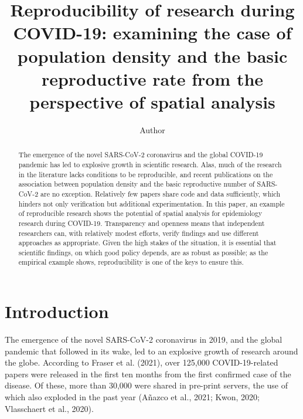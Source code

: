 \documentclass[]{elsarticle} %
\begin{document}
\begin{frontmatter}

  \title{Reproducibility of research during COVID-19: examining the case
of population density and the basic reproductive rate from the
perspective of spatial analysis}
    \author[University]{Author}
      \address[University]{Department, Street, City, State ZIP}
  
  \begin{abstract}
  The emergence of the novel SARS-CoV-2 coronavirus and the global
  COVID-19 pandemic has led to explosive growth in scientific research.
  Alas, much of the research in the literature lacks conditions to be
  reproducible, and recent publications on the association between
  population density and the basic reproductive number of SARS-CoV-2 are
  no exception. Relatively few papers share code and data sufficiently,
  which hinders not only verification but additional experimentation. In
  this paper, an example of reproducible research shows the potential of
  spatial analysis for epidemiology research during COVID-19.
  Transparency and openness means that independent researchers can, with
  relatively modest efforts, verify findings and use different
  approaches as appropriate. Given the high stakes of the situation, it
  is essential that scientific findings, on which good policy depends,
  are as robust as possible; as the empirical example shows,
  reproducibility is one of the keys to ensure this.
  \end{abstract}
  
 \end{frontmatter}

\newpage

\hypertarget{introduction}{%
\section{Introduction}\label{introduction}}

The emergence of the novel SARS-CoV-2 coronavirus in 2019, and the
global pandemic that followed in its wake, led to an explosive growth of
research around the globe. According to Fraser et al. (2021), over
125,000 COVID-19-related papers were released in the first ten months
from the first confirmed case of the disease. Of these, more than 30,000
were shared in pre-print servers, the use of which also exploded in the
past year (Añazco et al., 2021; Kwon, 2020; Vlasschaert et al., 2020).
\end{document}

